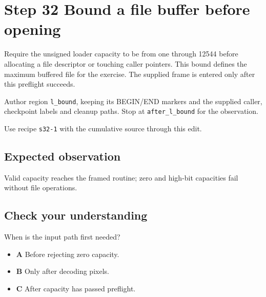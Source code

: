 \section{Step 32 Bound a file buffer before opening}\label{ppm-s32}

Require the unsigned loader capacity to be from one through 12544 before allocating a file descriptor or touching caller pointers. This bound defines the maximum buffered file for the exercise. The supplied frame is entered only after this preflight succeeds.

Author region \texttt{l\_bound}, keeping its BEGIN/END markers and the supplied caller, checkpoint labels and cleanup paths. Stop at \texttt{after\_l\_bound} for the observation.

Use recipe \texttt{s32-1} with the cumulative source through this edit.

\subsection{Expected observation}
Valid capacity reaches the framed routine; zero and high-bit capacities fail without file operations.

\subsection{Check your understanding}
When is the input path first needed?

\begin{itemize}
  \item \textbf{A} Before rejecting zero capacity.
  \item \textbf{B} Only after decoding pixels.
  \item \textbf{C} After capacity has passed preflight.
\end{itemize}
